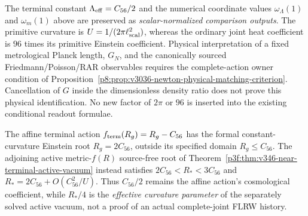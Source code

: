 \documentclass[12pt,a4paper]{article}
\begin{document}
\begin{remark}
\label{p9:rem:v3036-cosmology-newton-dependency}
The terminal constant $\Lambda_{\rm eff}=C_{56}/2$ and the numerical
coordinate values $\omega_\Lambda(1)$ and $\omega_m(1)$ above are
preserved as \emph{scalar-normalized comparison outputs}. The primitive
curvature is $U=1/(2\pi\ell_{\rm scal}^2)$, whereas the ordinary joint
heat coefficient is $96$ times its primitive Einstein coefficient.
Physical interpretation of a fixed metrological Planck length,
$G_N$, and the canonically sourced Friedmann/Poisson/RAR observables
requires the complete-action owner condition of
Proposition~\ref{p8:prop:v3036-newton-physical-matching-criterion}.
Cancellation of $G$ inside the dimensionless density ratio does not
prove this physical identification. No new factor of $2\pi$ or $96$ is
inserted into the existing conditional readout formulae.

The affine terminal action $f_{\rm term}(R_g)=R_g-C_{56}$ has the
formal constant-curvature Einstein root $R_g=2C_{56}$, outside its
specified domain $R_g\le C_{56}$.  The adjoining active metric-$f(R)$
source-free root of
Theorem~\ref{p3f:thm:v346-near-terminal-active-vacuum} instead satisfies
$2C_{56}<R_*<3C_{56}$ and
$R_*=2C_{56}+O(C_{56}^2/U)$.
Thus $C_{56}/2$ remains the affine action's cosmological coefficient,
while $R_*/4$ is the \emph{effective curvature parameter} of the
separately solved active vacuum, not a proof of an actual complete-joint
FLRW history.
\end{remark}
\end{document}
